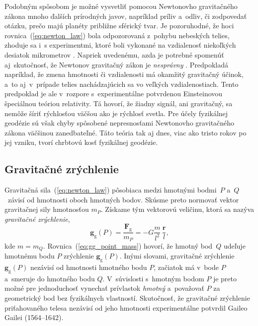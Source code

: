 \documentclass[a4paper,12pt]{book}
\newcommand{\gidx}{\mathrm g}
\let\vec\mathbf
\begin{document}
Podobným spôsobom je možné vysvetliť pomocou Newtonovho gravitačného zákona 
mnoho ďalších prírodných javov, napríklad príliv a~odliv, či zodpovedať otázku, 
prečo majú planéty približne sférický tvar.  Je pozoruhodné, že hoci 
rovnica~(\ref{eq:newton_law}) bola odpozorovaná z~pohybu nebeských telies, 
zhoduje sa i~s experimentmi, ktoré boli vykonané na vzdialenosť niekoľkých 
desiatok mikrometrov \parencite{Lee2020}.  Napriek uvedenému, azda je potrebné 
spomenúť aj~skutočnosť, že Newtonov gravitačný zákon je \emph{nesprávny} 
\parencite{Feynman}.  Predpokladá napríklad, že zmena hmotnosti či vzdialenosti 
má okamžitý gravitačný účinok, a~to aj~v~prípade telies nachádzajúcich sa vo 
veľkých vzdialenostiach.  Tento predpoklad je ale v~rozpore s~experimentálne 
potvrdenou Einsteinovou špeciálnou teóriou relativity.  Tá hovorí, že žiadny 
signál, ani gravitačný, sa nemôže šíriť rýchlosťou väčšou ako je rýchlosť 
svetla.  Pre účely fyzikálnej geodézie sú však chyby spôsobené nepresnosťami 
Newtonovho gravitačného zákona väčšinou zanedbateľné.  Táto teória tak aj dnes, 
viac ako tristo rokov po jej vzniku, tvorí chrbtovú kosť fyzikálnej geodézie.






\subsection{Gravitačné zrýchlenie}
\label{sec:gg}

Gravitačná sila~(\ref{eq:newton_law}) pôsobiaca medzi hmotnými bodmi~$P$ 
a~$Q$~závisí od hmotnosti oboch hmotných bodov.  Skúsme preto normovať vektor 
gravitačnej sily hmotnosťou $m_P$.  Získame tým vektorovú veličinu, ktorá sa 
nazýva \emph{gravitačné zrýchlenie},
%
\begin{equation}
\label{eq:gg_point_mass}
\vec g_\gidx(P) = \frac{\vec F_\gidx}{m_P} = -G \frac{m}{l^2} \, \frac{\vec
r}{l}{,}
\end{equation}
%
kde $m = m_Q$.  Rovnica~(\ref{eq:gg_point_mass}) hovorí, že hmotný
bod~$Q$ udeľuje hmotnému bodu $P$ zrýchlenie $\vec g_\gidx(P)$.   Inými
slovami, gravitačné zrýchlenie $\vec g_\gidx(P)$ nezávisí od hmotnosti hmotného
bodu $P$, začiatok má v~bode $P$ a~smeruje do hmotného bodu $Q$.  V~súvislosti
s~hmotným bodom $P$ je preto možné pre jednoduchosť vynechať prívlastok
\emph{hmotný} a~považovať $P$ za geometrický bod bez fyzikálnych vlastností.
Skutočnosť, že gravitačné zrýchlenie priťahovaného telesa nezávisí od jeho
hmotnosti experimentálne potvrdil Gaileo Gailei (1564--1642).
\end{document}
